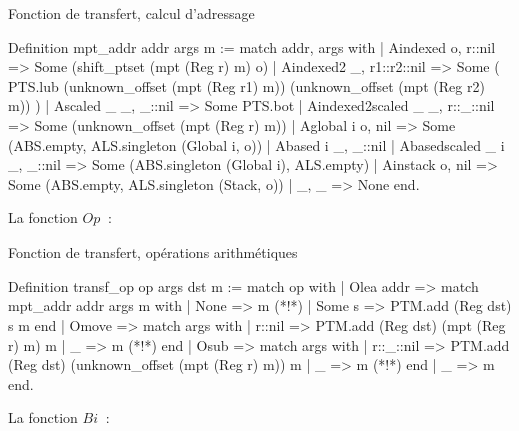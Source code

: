 \documentclass{article}
\newcommand\mi{\mathit}
\newcommand\Op[1]{Op_{\mi{#1}}}
\newcommand\Bi[1]{Bi_{\mi{#1}}}
\begin{document}
\begin{coqcode}
\caption{Fonction de transfert, calcul d'adressage}
\begin{english}
\begin{coq}
Definition mpt_addr addr args m :=
match addr, args with
  | Aindexed o, r::nil             =>
    Some (shift_ptset (mpt (Reg r) m) o)
  | Aindexed2 _, r1::r2::nil       =>
    Some (
      PTS.lub
      (unknown_offset (mpt (Reg r1) m))
      (unknown_offset (mpt (Reg r2) m))
    )
  | Ascaled _ _, _::nil            => Some PTS.bot
  | Aindexed2scaled _ _, r::_::nil =>
    Some (unknown_offset (mpt (Reg r) m))
  | Aglobal i o, nil               =>
    Some (ABS.empty, ALS.singleton (Global i, o))
  | Abased i _, _::nil
  | Abasedscaled _ i _, _::nil     =>
    Some (ABS.singleton (Global i), ALS.empty)
  | Ainstack o, nil                =>
    Some (ABS.empty, ALS.singleton (Stack, o))
  | _, _                           => None
end.
\end{coq}
\end{english}
\end{coqcode}

\newpage

La fonction $\Op{}$~:

\begin{coqcode}
\caption{Fonction de transfert, opérations arithmétiques}
\begin{english}
\begin{coq}
Definition transf_op op args dst m :=
  match op with
    | Olea addr =>
      match mpt_addr addr args m with
        | None   => m (*!*)
        | Some s => PTM.add (Reg dst) s m
      end
    | Omove     =>
      match args with
        | r::nil => PTM.add (Reg dst) (mpt (Reg r) m) m
        | _      => m (*!*)
      end
    | Osub      =>
      match args with
        | r::_::nil => PTM.add (Reg dst) (unknown_offset (mpt (Reg r) m)) m
        | _         => m (*!*)
      end
    | _         => m
  end.
\end{coq}
\end{english}
\end{coqcode}

\newpage

La fonction $\Bi{}$~:
\end{document}
